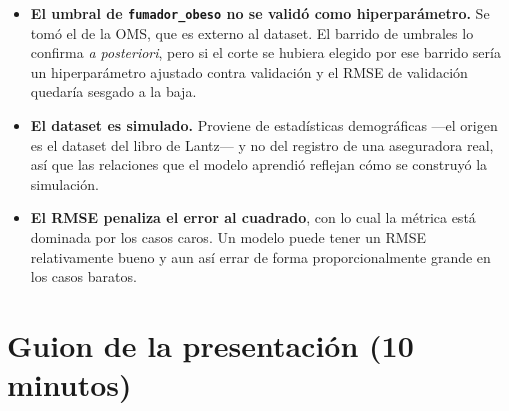 \documentclass[11pt,a4paper]{article}
\begin{document}
\begin{itemize}
  \item \textbf{El umbral de \texttt{fumador\_obeso} no se validó como hiperparámetro.} Se tomó
        el de la OMS, que es externo al dataset. El barrido de umbrales lo confirma
        \emph{a posteriori}, pero si el corte se hubiera elegido por ese barrido sería un
        hiperparámetro ajustado contra validación y el RMSE de validación quedaría sesgado a la
        baja.

  \item \textbf{El dataset es simulado.} Proviene de estadísticas demográficas ---el origen es
        el dataset del libro de Lantz--- y no del registro de una aseguradora real, así que las
        relaciones que el modelo aprendió reflejan cómo se construyó la simulación.

  \item \textbf{El RMSE penaliza el error al cuadrado}, con lo cual la métrica está dominada
        por los casos caros. Un modelo puede tener un RMSE relativamente bueno y aun así errar
        de forma proporcionalmente grande en los casos baratos.
\end{itemize}

\section{Guion de la presentación (10 minutos)}
\end{document}
